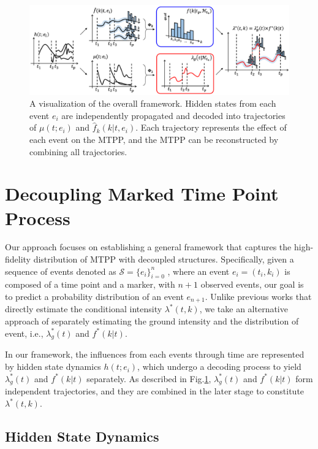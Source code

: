 \begin{figure}[h]
    \centering
    \includegraphics[width=0.95\linewidth]{figure/main_figure_final.png}
    \caption{\small A visualization of the overall framework. Hidden states from each event $e_i$ are independently propagated and decoded into trajectories of $\mu(t;e_i)$ and $\hat{f}_k (k|t, e_i)$. Each trajectory represents the effect of each event on the MTPP, and the MTPP can be reconstructed by combining all trajectories.}
    \label{fig:main}
\end{figure}

\section{Decoupling Marked Time Point Process}
Our approach focuses on establishing a general framework that captures the high-fidelity distribution of MTPP with decoupled structures. 
Specifically, given a sequence of events denoted as $\mathcal{S} = \{e_i\}_{i=0} ^n$
, where an event $e_i = (t_i, k_i)$ is composed of a time point and a marker, with $n+1$
observed events, our goal is to predict a probability distribution of an event $e_{n+1}$. 
Unlike previous works that directly estimate the conditional intensity $\lambda^*(t,k)$, we take an alternative approach of 
separately estimating the ground intensity and the distribution of event, i.e., $\lambda _g ^*(t)$ and $f^*(k|t)$. 

In our framework, the influences from each events through time are represented by hidden state dynamics $h(t;e_i)$, which  
undergo a decoding process 
to yield $\lambda ^*_g(t)$ and $f^*(k|t)$ separately. As described in Fig.\ref{fig:main}, $\lambda^* _g(t)$ and $f^*(k|t)$ form independent trajectories, and they are combined in the later stage to constitute $\lambda^*(t,k)$.


\subsection{Hidden State Dynamics \label{continuous modeling}} 

